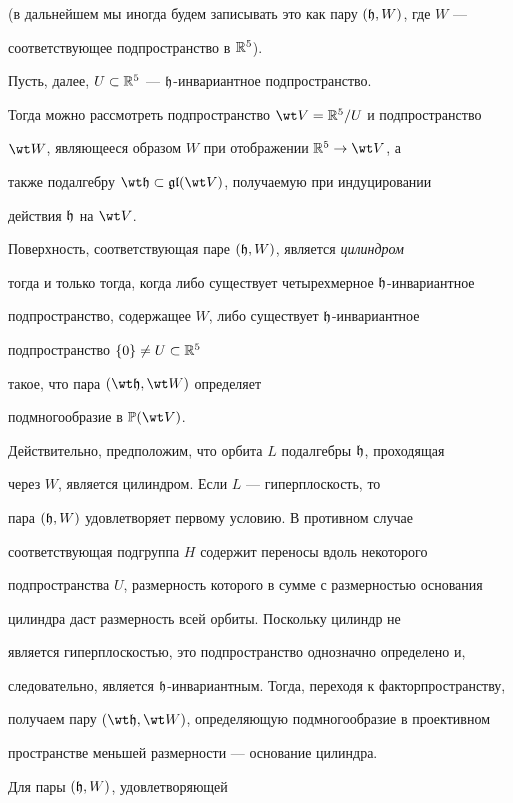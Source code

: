 (в дальнейшем мы иногда будем записывать это как пару $(\frak h,W)$, где $W$ ---


соответствующее подпространство в $\Bbb R^5$).


Пусть, далее, $U\subset \Bbb R^5$ --- $\frak h$-инвариантное подпространство.


Тогда можно рассмотреть подпространство $\Vt=\Bbb R^5/U$ и подпространство


$\Wt$, являющееся образом $W$ при отображении $\Bbb R^5\to \Vt$, а


также подалгебру $\wt\h\subset \gl(\Vt)$, получаемую при индуцировании


действия $\frak h$ на $\Vt$.





Поверхность, соответствующая паре $(\frak h,W)$, является {\it цилиндром}


тогда и только тогда, когда либо существует четырехмерное $\frak h$-инвариантное


подпространство, содержащее $W$, либо существует $\frak h$-инвариантное


подпространство $\{0\}\ne U\subset\Bbb R^5$


такое, что пара $(\wt\h,\Wt)$ определяет 


подмногообразие в $\Bbb P(\Vt)$.





Действительно, предположим, что орбита $L$ подалгебры $\frak h$, проходящая


через $W$, является цилиндром. Если $L$ --- гиперплоскость, то


пара $(\frak h,W)$ удовлетворяет первому условию. В противном случае


соответствующая подгруппа $H$ содержит переносы вдоль некоторого 


подпространства $U$, размерность которого в сумме с размерностью основания


цилиндра даст размерность всей орбиты. Поскольку цилиндр не


является гиперплоскостью, это подпространство однозначно определено и,


следовательно, является $\frak h$-инвариантным. Тогда, переходя к факторпространству,


получаем пару $(\wt\h,\Wt)$, определяющую подмногообразие в проективном


пространстве меньшей размерности --- основание цилиндра.


Для пары $(\frak h,W)$, удовлетворяющей


